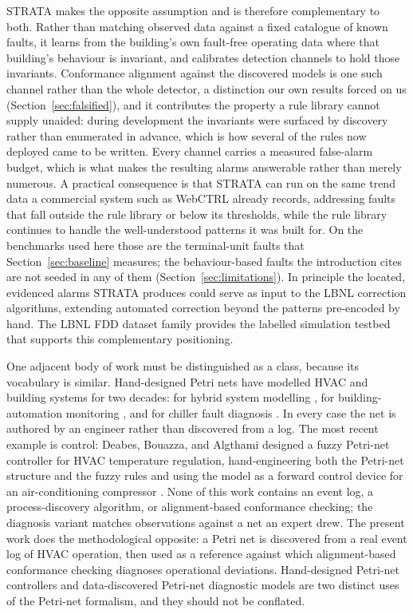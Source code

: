 \documentclass[11pt,letterpaper]{article}
\begin{document}
STRATA makes the opposite assumption and is therefore complementary to both. Rather than matching observed data against a fixed catalogue of known faults, it learns from the building's own fault-free operating data where that building's behaviour is invariant, and calibrates detection channels to hold those invariants. Conformance alignment against the discovered models is one such channel rather than the whole detector, a distinction our own results forced on us (Section~\ref{sec:falsified}), and it contributes the property a rule library cannot supply unaided: during development the invariants were surfaced by discovery rather than enumerated in advance, which is how several of the rules now deployed came to be written. Every channel carries a measured false-alarm budget, which is what makes the resulting alarms answerable rather than merely numerous. A practical consequence is that STRATA can run on the same trend data a commercial system such as WebCTRL already records, addressing faults that fall outside the rule library or below its thresholds, while the rule library continues to handle the well-understood patterns it was built for. On the benchmarks used here those are the terminal-unit faults that Section~\ref{sec:baseline} measures; the behaviour-based faults the introduction cites are not seeded in any of them (Section~\ref{sec:limitations}). In principle the located, evidenced alarms STRATA produces could serve as input to the LBNL correction algorithms, extending automated correction beyond the patterns pre-encoded by hand. The LBNL FDD dataset family \cite{granderson2020lbnlfdddata,granderson2022lbnlfdddatasets,granderson2023lbnlfdddata} provides the labelled simulation testbed that supports this complementary positioning.

One adjacent body of work must be distinguished as a class, because its vocabulary is similar. Hand-designed Petri nets have modelled HVAC and building systems for two decades: for hybrid system modelling \cite{villani2004hybridpetri}, for building-automation monitoring \cite{gomes2007petribas}, and for chiller fault diagnosis \cite{xu2015chillerpetri}. In every case the net is authored by an engineer rather than discovered from a log. The most recent example is control: Deabes, Bouazza, and Algthami designed a fuzzy Petri-net controller for HVAC temperature regulation, hand-engineering both the Petri-net structure and the fuzzy rules and using the model as a forward control device for an air-conditioning compressor \cite{deabes2023fuzzyptn}. None of this work contains an event log, a process-discovery algorithm, or alignment-based conformance checking; the diagnosis variant matches observations against a net an expert drew. The present work does the methodological opposite: a Petri net is discovered from a real event log of HVAC operation, then used as a reference against which alignment-based conformance checking diagnoses operational deviations. Hand-designed Petri-net controllers and data-discovered Petri-net diagnostic models are two distinct uses of the Petri-net formalism, and they should not be conflated.
\end{document}
